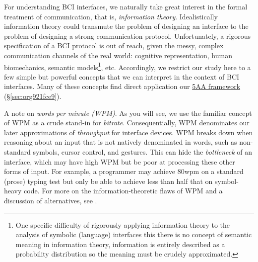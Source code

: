 \documentclass[logo,bsc,singlespacing,parskip]{infthesis}
\begin{document}
For understanding BCI interfaces, we naturally take great interest in the formal treatment of communication, that is, \emph{information theory}.
Idealistically information theory could transmute the problem of designing an interface to the problem of designing a strong communication protocol.
Unfortunately, a rigorous specification of a BCI protocol is out of reach, given the messy, complex communication channels of the real world: cognitive representation, human biomechanics, semantic models\footnote{One specific difficulty of rigorously applying information theory to the analysis of symbolic (language) interfaces this there is no concept of semantic meaning in information theory, information is entirely described as a probability distribution so the meaning must be crudely approximated.}, etc.
Accordingly, we restrict our study here to a few simple but powerful concepts that we can interpret in the context of BCI interfaces.
Many of these concepts find direct application our \hyperref[sec:org921fce9]{5AA framework} (\S \ref{sec:org921fce9}).

A note on \emph{words per minute (WPM)}.
As you will see, we use the familiar concept of WPM as a crude stand-in for \emph{bitrate}.
Consequentially, WPM denominates our later approximations of \emph{throughput} for interface devices.
WPM breaks down when reasoning about an input that is not natively denominated in words, such as non-standard symbols, cursor control, and gestures.
This can hide the \emph{bottleneck} of an interface, which may have high WPM but be poor at processing these other forms of input.
For example, a programmer may achieve 80wpm on a standard (prose) typing test but only be able to achieve less than half that on symbol-heavy code.
For more on the information-theoretic flaws of WPM and a discussion of alternatives, see \autocite[pp. 57]{liuInformationTheoryUnified}.
\end{document}
